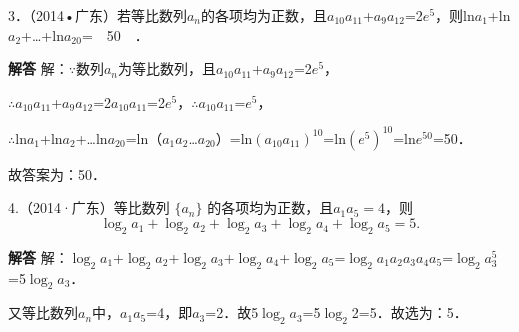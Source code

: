 3．（2014•广东）若等比数列{\ensuremath{a_{n}}}的各项均为正数，且\ensuremath{a_{10}}\ensuremath{a_{11}}+\ensuremath{a_{9}}\ensuremath{a_{12}}=2\ensuremath{e^{5}}，则ln\ensuremath{a_{1}}+ln\ensuremath{a_{2}}+\ldots{}+ln\ensuremath{a_{20}}=　50　．\par
\QuestionSpace{2.5cm}
\ifshowanswers
\par\begingroup\color{solutioncolor}\noindent\textbf{解答}\quad
解：\ensuremath{\because}数列{\ensuremath{a_{n}}}为等比数列，且\ensuremath{a_{10}}\ensuremath{a_{11}}+\ensuremath{a_{9}}\ensuremath{a_{12}}=2\ensuremath{e^{5}}，\par
\ensuremath{\therefore}\ensuremath{a_{10}}\ensuremath{a_{11}}+\ensuremath{a_{9}}\ensuremath{a_{12}}=2\ensuremath{a_{10}}\ensuremath{a_{11}}=2\ensuremath{e^{5}}，\ensuremath{\therefore}\ensuremath{a_{10}}\ensuremath{a_{11}}=\ensuremath{e^{5}}，\par
\ensuremath{\therefore}ln\ensuremath{a_{1}}+ln\ensuremath{a_{2}}+\ldots{}ln\ensuremath{a_{20}}=ln（\ensuremath{a_{1}}\ensuremath{a_{2}}\ldots{}\ensuremath{a_{20}}）=ln\ensuremath{(a_{10}a_{11})^{10}}=ln\ensuremath{(e^{5})^{10}}=ln\ensuremath{e^{50}}=50．\par
故答案为：50．\par
\par\endgroup\fi

4.（2014·广东）等比数列 $\{a_n\}$ 的各项均为正数，且$a_1a_5=4$，则\[\log_2a_1+\log_2a_2+\log_2a_3+\log_2a_4+\log_2a_5=5.\]\par
\QuestionSpace{2.5cm}
\ifshowanswers
\par\begingroup\color{solutioncolor}\noindent\textbf{解答}\quad
解：\ensuremath{\log_{2}}\ensuremath{a_{1}}+\ensuremath{\log_{2}}\ensuremath{a_{2}}+\ensuremath{\log_{2}}\ensuremath{a_{3}}+\ensuremath{\log_{2}}\ensuremath{a_{4}}+\ensuremath{\log_{2}}\ensuremath{a_{5}}=\ensuremath{\log_{2}}\ensuremath{a_{1}}\ensuremath{a_{2}}\ensuremath{a_{3}}\ensuremath{a_{4}}\ensuremath{a_{5}}=\ensuremath{\log_{2}}\ensuremath{a_{3}^{5}}=5\ensuremath{\log_{2}}\ensuremath{a_{3}}．\par
又等比数列{\ensuremath{a_{n}}}中，\ensuremath{a_{1}}\ensuremath{a_{5}}=4，即\ensuremath{a_{3}}=2．故5\ensuremath{\log_{2}}\ensuremath{a_{3}}=5\ensuremath{\log_{2}}2=5．故选为：5．\par
\par\endgroup\fi

